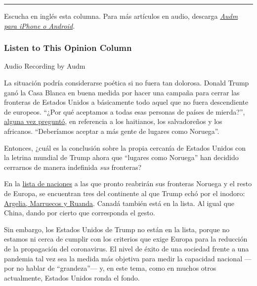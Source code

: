 \begin{center}\rule{0.5\linewidth}{\linethickness}\end{center}

Escucha en inglés esta columna. Para más artículos en audio, descarga
\href{https://www.audm.com/?utm_source=nytopinion\&utm_medium=embed\&utm_campaign=world_america_out}{\emph{Audm
para iPhone o Android}}\emph{.}

\hypertarget{listen-to-this-opinion-column}{%
\subsubsection{Listen to This Opinion
Column}\label{listen-to-this-opinion-column}}

Audio Recording by Audm

La situación podría considerarse poética si no fuera tan dolorosa.
Donald Trump ganó la Casa Blanca en buena medida por hacer una campaña
para cerrar las fronteras de Estados Unidos a básicamente todo aquel que
no fuera descendiente de europeos. ``¿Por qué aceptamos a todas esas
personas de países de mierda?'',
\href{https://www.washingtonpost.com/politics/trump-attacks-protections-for-immigrants-from-shithole-countries-in-oval-office-meeting/2018/01/11/bfc0725c-f711-11e7-91af-31ac729add94_story.html}{alguna
vez preguntó}, en referencia a los haitianos, los salvadoreños y los
africanos. ``Deberíamos aceptar a más gente de lugares como Noruega''.

Entonces, ¿cuál es la conclusión sobre la propia cercanía de Estados
Unidos con la letrina mundial de Trump ahora que ``lugares como
Noruega'' han decidido cerrarnos de manera indefinida \emph{sus}
fronteras?

En la
\href{https://www.consilium.europa.eu/en/press/press-releases/2020/06/30/council-agrees-to-start-lifting-travel-restrictions-for-residents-of-some-third-countries/}{lista
de naciones} a las que pronto reabrirán sus fronteras Noruega y el resto
de Europa, se encuentran tres del continente al que Trump echó por el
inodoro:
\href{https://www.nytimes3xbfgragh.onion/2020/06/30/world/europe/eu-reopening-blocks-us-travelers.html}{Argelia,
Marruecos y Ruanda}. Canadá también está en la lista. Al igual que
China, dando por cierto que corresponda el gesto.

Sin embargo, los Estados Unidos de Trump no están en la lista, porque no
estamos ni cerca de cumplir con los criterios que exige Europa para la
reducción de la propagación del coronavirus. El nivel de éxito de una
sociedad frente a una pandemia tal vez sea la medida más objetiva para
medir la capacidad nacional ---por no hablar de ``grandeza''--- y, en
este tema, como en muchos otros actualmente, Estados Unidos ronda el
fondo.

